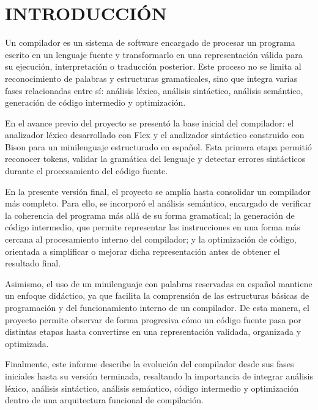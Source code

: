 \chapter*{INTRODUCCIÓN}

Un compilador es un sistema de software encargado de procesar un programa escrito en un lenguaje fuente y transformarlo en una representación válida para su ejecución, interpretación o traducción posterior. Este proceso no se limita al reconocimiento de palabras y estructuras gramaticales, sino que integra varias fases relacionadas entre sí: análisis léxico, análisis sintáctico, análisis semántico, generación de código intermedio y optimización.

En el avance previo del proyecto se presentó la base inicial del compilador: el analizador léxico desarrollado con Flex y el analizador sintáctico construido con Bison para un minilenguaje estructurado en español. Esta primera etapa permitió reconocer tokens, validar la gramática del lenguaje y detectar errores sintácticos durante el procesamiento del código fuente.

En la presente versión final, el proyecto se amplía hasta consolidar un compilador más completo. Para ello, se incorporó el análisis semántico, encargado de verificar la coherencia del programa más allá de su forma gramatical; la generación de código intermedio, que permite representar las instrucciones en una forma más cercana al procesamiento interno del compilador; y la optimización de código, orientada a simplificar o mejorar dicha representación antes de obtener el resultado final.

Asimismo, el uso de un minilenguaje con palabras reservadas en español mantiene un enfoque didáctico, ya que facilita la comprensión de las estructuras básicas de programación y del funcionamiento interno de un compilador. De esta manera, el proyecto permite observar de forma progresiva cómo un código fuente pasa por distintas etapas hasta convertirse en una representación validada, organizada y optimizada.

Finalmente, este informe describe la evolución del compilador desde sus fases iniciales hasta su versión terminada, resaltando la importancia de integrar análisis léxico, análisis sintáctico, análisis semántico, código intermedio y optimización dentro de una arquitectura funcional de compilación.
